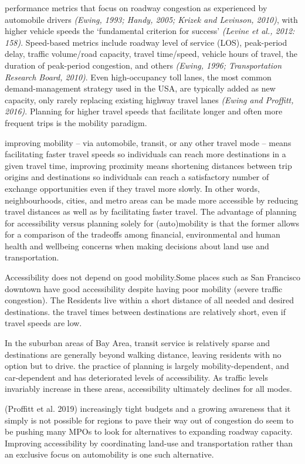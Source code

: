 \documentclass[12pt,]{article}
\begin{document}
performance metrics that focus on roadway congestion as experienced by
automobile drivers \emph{(Ewing, 1993; Handy, 2005; Krizek and Levinson,
2010)}, with higher vehicle speeds the `fundamental criterion for
success' \emph{(Levine et al., 2012: 158)}. Speed-based metrics include
roadway level of service (LOS), peak-period delay, traffic volume/road
capacity, travel time/speed, vehicle hours of travel, the duration of
peak-period congestion, and others \emph{(Ewing, 1996; Transportation
Research Board, 2010)}. Even high-occupancy toll lanes, the most common
demand-management strategy used in the USA, are typically added as new
capacity, only rarely replacing existing highway travel lanes
\emph{(Ewing and Proffitt, 2016)}. Planning for higher travel speeds
that facilitate longer and often more frequent trips is the mobility
paradigm.

improving mobility -- via automobile, transit, or any other travel mode
-- means facilitating faster travel speeds so individuals can reach more
destinations in a given travel time, improving proximity means
shortening distances between trip origins and destinations so
individuals can reach a satisfactory number of exchange opportunities
even if they travel more slowly. In other words, neighbourhoods, cities,
and metro areas can be made more accessible by reducing travel distances
as well as by facilitating faster travel. The advantage of planning for
accessibility versus planning solely for (auto)mobility is that the
former allows for a comparison of the tradeoffs among financial,
environmental and human health and wellbeing concerns when making
decisions about land use and transportation.

Accessibility does not depend on good mobility.Some places such as San
Francisco downtown have good accessibility despite having poor mobility
(severe traffic congestion). The Residents live within a short distance
of all needed and desired destinations. the travel times between
destinations are relatively short, even if travel speeds are low.

In the suburban areas of Bay Area, transit service is relatively sparse
and destinations are generally beyond walking distance, leaving
residents with no option but to drive. the practice of planning is
largely mobility-dependent, and car-dependent and has deteriorated
levels of accessibility. As traffic levels invariably increase in these
areas, accessibility ultimately declines for all modes.

(Proffitt et al. 2019) increasingly tight budgets and a growing
awareness that it simply is not possible for regions to pave their way
out of congestion do seem to be pushing many MPOs to look for
alternatives to expanding roadway capacity. Improving accessibility by
coordinating land-use and transportation rather than an exclusive focus
on automobility is one such alternative.
\end{document}

